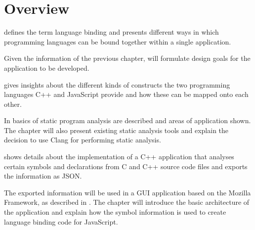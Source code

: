 \chapter{Overview}

 defines the term language binding and presents different ways in which programming languages can be bound together within a single application.

Given the information of the previous chapter,  will formulate design goals for the application to be developed.

 gives insights about the different kinds of constructs the two programming languages C++ and JavaScript provide and how these can be mapped onto each other.

In  basics of static program analysis are described and areas of application shown. The chapter will also present existing static analysis tools and explain the decision to use Clang for performing static analysis.

 shows details about the implementation of a C++ application that analyses certain symbols and declarations from C and C++ source code files and exports the information as JSON.

The exported information will be used in a GUI application based on the Mozilla Framework, as described in . The chapter will introduce the basic architecture of the application and explain how the symbol information is used to create language binding code for JavaScript.



